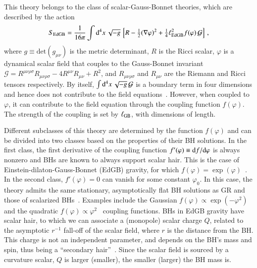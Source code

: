 \documentclass[twocolumn,
               prd,
               aps,
               superscriptaddress,
               tightenlines,
               nofootinbib,
               eqsecnum,
               amsfonts,
               amsmath,
               longbibliography]{revtex4-1}
\newcommand{\dd}{{\rm d}}
\newcommand{\dV}{{\rm d}^{4}x \, \sqrt{-g} \,}
\begin{document}
This theory belongs to the class of scalar-Gauss-Bonnet theories, which are
described by the action
%
\begin{equation} \label{eq:action_sgb}
    S_{\rm EdGB} = \frac{1}{16 \pi}
    \int \dV
    \left[
    R - \tfrac{1}{2}(\nabla \varphi)^2
    + \tfrac{1}{4} \ell^{2}_{\rm EdGB} f(\varphi) \, \mathcal{G}
    \right]\,,
\end{equation}
%
where $g \equiv \textrm{det}(g_{\mu \nu})$ is the metric determinant, $R$ is the Ricci
scalar, $\varphi$ is a dynamical scalar field that couples to the
Gauss-Bonnet invariant
%
$\mathcal{G} =
R^{\mu\nu\rho\sigma}R_{\mu\nu\rho\sigma}
- 4 R^{\mu\nu}R_{\mu\nu}
+ R^2$,
%
and $R_{\mu\nu\rho\sigma}$ and $R_{\mu\nu}$ are the Riemann and Ricci tensors respectively.
%
By itself, $\int \dV \mathcal{G}$ is a boundary term in four dimensions
and hence does not contribute to the field equations~\cite{Myers:1987yn}.
%
However,  when coupled to $\varphi$, it can contribute to the field equation
through the coupling function $f(\varphi)$. The strength of the coupling is
set by $\ell_{\rm GB}$, with dimensions of length.

Different subclasses of this theory are determined by the function $f(\varphi)$
and can be divided into two classes based on the properties of their BH
solutions.
%
In the first class, the first derivative of the coupling function $f'(\varphi)
\equiv \dd f  / \dd \varphi$ is always nonzero and BHs are known to always
support scalar hair.
%
This is the case of Einstein-dilaton-Gauss-Bonnet (EdGB) gravity, for which
$f(\varphi) = \exp(\varphi)$~\cite{Kanti:1995vq}.
%
In the second class, $f'(\varphi) = 0$ can vanish for some constant $\varphi_0$.
%
In this case, the theory admits the same stationary, asymptotically flat BH
solutions as GR and those of scalarized
BHs~\cite{Doneva:2017bvd,Silva:2017uqg,Macedo:2019sem,Dima:2020yac,Herdeiro:2020wei,Berti:2020kgk}.
%
Examples include the Gaussian $f(\varphi) \propto \exp(-\varphi^2)$~\cite{Doneva:2017bvd} and
the quadratic $f(\varphi) \propto \varphi^2$~\cite{Silva:2017uqg} coupling functions.
BHs in EdGB gravity have scalar hair, to which we can associate a (monopole) scalar charge $Q$,
related to the asymptotic $r^{-1}$ fall-off of the scalar field, where $r$ is the distance from the BH.
%
This charge is not an independent parameter, and depends on the BH's mass and spin,
thus being a ``secondary hair''~\cite{Coleman:1991ku,Herdeiro:2015waa}.
%
Since the scalar field is sourced by a curvature scalar, $Q$ is larger (smaller),
the smaller (larger) the BH mass is.
\end{document}
